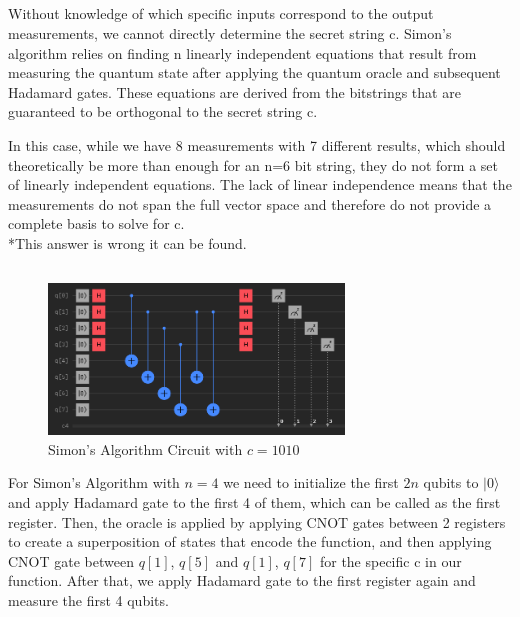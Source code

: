 \documentclass[12pt]{article}
\begin{document}
\subsection*{}

Without knowledge of which specific inputs correspond to the output measurements, we cannot directly determine the secret string c. Simon's algorithm relies on finding n linearly independent equations that result from measuring the quantum state after applying the quantum oracle and subsequent Hadamard gates. These equations are derived from the bitstrings that are guaranteed to be orthogonal to the secret string c.

In this case, while we have 8 measurements with 7 different results, which should theoretically be more than enough for an n=6 bit string, they do not form a set of linearly independent equations. The lack of linear independence means that the measurements do not span the full vector space and therefore do not provide a complete basis to solve for c. 
\\


*This answer is wrong it can be found.

\subsection*{}

\begin{figure}[H]
    \centering
    \includegraphics[width=0.7\textwidth]{1010.png}
    \caption{Simon's Algorithm Circuit with $ c = 1010 $}
\end{figure}

For Simon’s Algorithm with $ n = 4 $ we need to initialize the first $ 2n $ qubits to $ |0\rangle $ and apply Hadamard gate to the first 4 of them, which can be called as the first register. Then, the oracle is applied by applying CNOT gates between 2 registers to create a superposition of states that encode the function, and then applying CNOT gate between $q[1]$, $q[5]$ and $q[1]$, $q[7]$ for the specific c in our function. After that, we apply Hadamard gate to the first register again and measure the first 4 qubits. 
\end{document}
